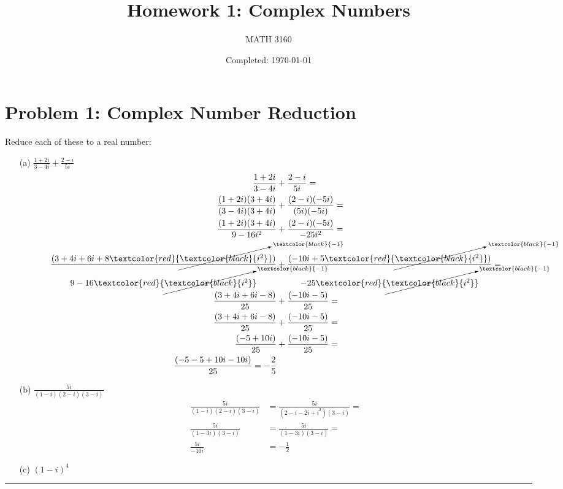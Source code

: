 \documentclass{article}
\title{Homework 1: Complex Numbers}
\author{
  MATH 3160\\
  \myauthor
}
\date{Completed: \today}
\newcommand{\canceling}[2]{\textcolor{red}{\cancelto{\textcolor{black}{#1}}{\textcolor{black}{#2}}}}
\begin{document}
\maketitle %


\section*{Problem 1: Complex Number Reduction}
Reduce each of these to a real number:
\begin{enumerate}
\item[(a)] $ \frac{1+2i}{3-4i} + \frac{2-i}{5i}$
  \begin{align*}
    \frac{1+2i}{3-4i} &+ \frac{2-i}{5i} = \\
    \frac{(1+2i)(3+4i)}{(3-4i)(3+4i)} &+ \frac{(2-i)(-5i)}{(5i)(-5i)} = \\
    \frac{(1+2i)(3+4i)}{9-16i^2} &+ \frac{(2-i)(-5i)}{-25i^2} = \\
    \frac{(3+4i+6i+8\canceling{-1}{i^2})}{9-16\canceling{-1}{i^2}} &+ \frac{(-10i+5\canceling{-1}{i^2})}{-25\canceling{-1}{i^2}} = \\
    \frac{(3+4i+6i-8)}{25} &+ \frac{(-10i-5)}{25} = \\
    \frac{(3+4i+6i-8)}{25} &+ \frac{(-10i-5)}{25} = \\
    \frac{(-5+10i)}{25} &+ \frac{(-10i-5)}{25} = \\
    \frac{(-5-5+10i -10i)}{25} = -\frac{2}{5}\\
  \end{align*}
\item[(b)] $ \frac{5i}{(1-i)(2-i)(3-i)}$
  \begin{align*}
    \frac{5i}{(1-i)(2-i)(3-i)} &= \frac{5i}{(2-i-2i+i^2)(3-i)} = \\
    \frac{5i}{(1-3i)(3-i)} &= \frac{5i}{(1-3i)(3-i)} =\\
    \frac{5i}{-10i} &= -\frac{1}{2}
  \end{align*}
\item[(c)] $ (1-i)^4$
\end{enumerate}

\vspace{.5cm} %

\hrule %
\end{document}
